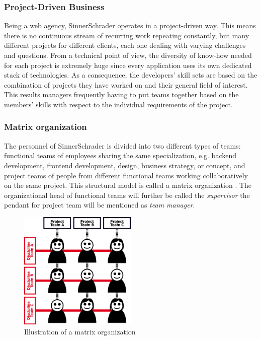 \subsubsection{Project-Driven Business}
Being a web agency, SinnerSchrader operates in a project-driven way. This means there is no continuous stream of recurring work repeating constantly, but many different projects for different clients, each one dealing with varying challenges and questions. From a technical point of view, the diversity of know-how needed for each project is extremely huge since every application uses its own dedicated stack of technologies. As a consequence, the developers’ skill sets are based on the combination of projects they have worked on and their general field of interest. This results managers frequently having to put teams together based on the members’ skills with respect to the individual requirements of the project.

\subsubsection{Matrix organization}
The personnel of SinnerSchrader is divided into two different types of teams: functional teams of
employees sharing the same specialization, e.g. backend development, frontend development, design, business strategy, or concept, and project teams of people from different functional teams working collaboratively on the same project. This structural model is called a matrix organization \cite[P. 75]{BWL}.
The organizational head of functional teams will further be called the \textit{supervisor} the pendant for project team will be mentioned as \textit{team manager}.

\begin{figure}[!htp]
    \centering
    \includegraphics[width=0.5\textwidth]{images/matrixorga.png}
    \caption[Diagram: Matrix organization]{Illustration of a matrix organization}
    \label{fig:matrixorga}
\end{figure}


